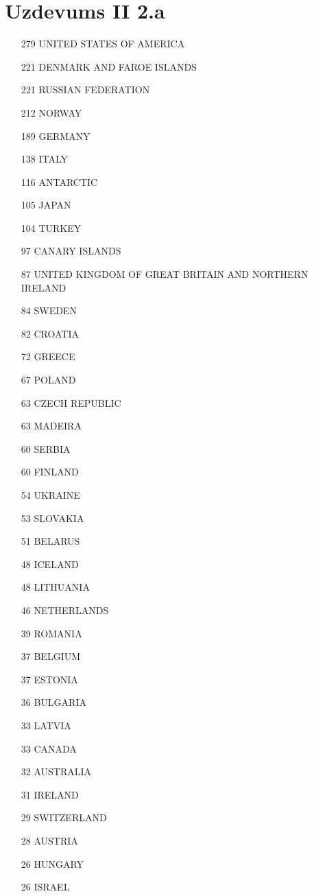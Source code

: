 \documentclass[12pt,a4paper]{article}
\begin{document}
\newpage
\appendix
\section{Uzdevums II 2.a}\label{ap:II 2.a}
\begin{multicols*}{3}
    \begin{itemize}
        \item[279] UNITED STATES OF AMERICA
\item[221] DENMARK AND FAROE ISLANDS
\item[221] RUSSIAN FEDERATION
\item[212] NORWAY
\item[189] GERMANY
\item[138] ITALY
\item[116] ANTARCTIC
\item[105] JAPAN
\item[104] TURKEY
\item[97] CANARY ISLANDS
\item[87] UNITED KINGDOM OF GREAT BRITAIN AND NORTHERN IRELAND
\item[84] SWEDEN
\item[82] CROATIA
\item[72] GREECE
\item[67] POLAND
\item[63] CZECH REPUBLIC
\item[63] MADEIRA
\item[60] SERBIA
\item[60] FINLAND
\item[54] UKRAINE
\item[53] SLOVAKIA
\item[51] BELARUS
\item[48] ICELAND
\item[48] LITHUANIA
\item[46] NETHERLANDS
\item[39] ROMANIA
\item[37] BELGIUM
\item[37] ESTONIA
\item[36] BULGARIA
\item[33] LATVIA
\item[33] CANADA
\item[32] AUSTRALIA
\item[31] IRELAND
\item[29] SWITZERLAND
\item[28] AUSTRIA
\item[26] HUNGARY
\item[26] ISRAEL

\end{itemize}
\end{multicols*}
\end{document}
